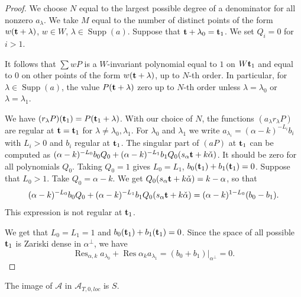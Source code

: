 \documentclass{article}
\newcommand{\mc}[1]{\mathcal{#1}}
\newcommand{\Res}{\operatorname{Res}}
\newcommand{\boldt}{\bold t}
\newcommand{\Supp}{\operatorname{Supp}}
\begin{document}
\begin{proof}
We choose $N$ equal to the largest possible degree of a denominator for all nonzero $a_{\lambda}$. We take $M$ equal to the number of distinct points of the form $w(\boldt+\lambda)$, $w\in W$, $\lambda\in \Supp(a)$. Suppose that $\boldt+\lambda_0=\boldt_1$. We set $Q_i=0$ for $i>1$.

It follows that $\sum wP$ is a $W$-invariant polynomial equal to $1$ on $W\boldt_1$ and equal to $0$ on other points of the form $w(\boldt+\lambda)$, up to $N$-th order. In particular, for $\lambda\in \Supp(a)$, the value $P(\boldt+\lambda)$ zero up to $N$-th order unless $\lambda=\lambda_0$ or $\lambda=\lambda_1$.

We have $(r_{\lambda}P)(\boldt_1)=P(\boldt_1+\lambda)$. With our choice of $N$, the functions $(a_{\lambda}r_{\lambda}P)$ are regular at $\boldt=\boldt_1$ for $\lambda\neq \lambda_0,\lambda_1$. For $\lambda_0$ and $\lambda_1$ we write $a_{\lambda_i}=(\alpha-k)^{-L_i}b_{i}$ with $L_i>0$ and $b_i$ regular at $\boldt_1$. The singular part of $(aP)$ at $\boldt_1$ can be computed as $(\alpha-k)^{-L_0}b_0Q_0+(\alpha-k)^{-L_1}b_1Q_0(s_{\alpha}\boldt+k\check{\alpha})$. It should be zero for all polynomials $Q_0$. Taking $Q_0=1$ gives $L_0=L_1$, $b_0(\boldt_1)+b_1(\boldt_1)=0$. Suppose that $L_0>1$. Take $Q_0=\alpha-k$. We get $Q_0(s_{\alpha}\boldt+k\check{\alpha})=k-\alpha$, so that \[(\alpha-k)^{-L_0}b_0Q_0+(\alpha-k)^{-L_1}b_1Q_0(s_{\alpha}\boldt+k\check{\alpha})=(\alpha-k)^{1-L_0}(b_0-b_1).\] This expression is not regular at $\boldt_1$.

We get that $L_0=L_1=1$ and $b_0(\boldt_1)+b_1(\boldt_1)=0$. Since the space of all possible $\boldt_1$ is Zariski dense in $\alpha^{\perp}$, we have \[\Res_{\alpha,k}a_{\lambda_0}+\Res{\alpha_k}a_{\lambda_1}=(b_0+b_1)|_{\alpha^{\perp}}=0.\]

\end{proof}
\begin{prop}
\label{PropImageOfAZeroResidue}
The image of $\mc{A}$ in $\mc{A}_{T,0,loc}$ is $S$.
\end{prop}
\end{document}

